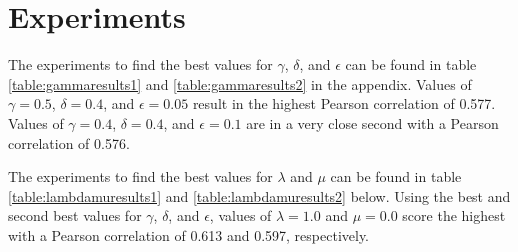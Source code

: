 \documentclass{article}
\begin{document}



\section{Experiments} \label{sec:experiments}

The experiments to find the best values for $\gamma$, $\delta$, and $\epsilon$ can be found in table \ref{table:gammaresults1} and \ref{table:gammaresults2} in the appendix. Values of $\gamma = 0.5$, $\delta = 0.4$, and $\epsilon = 0.05$ result in the highest Pearson correlation of 0.577. Values of $\gamma = 0.4$, $\delta = 0.4$, and $\epsilon = 0.1$ are in a very close second with a Pearson correlation of 0.576. 

The experiments to find the best values for $\lambda$ and $\mu$ can be found in table \ref{table:lambdamuresults1} and \ref{table:lambdamuresults2} below. Using the best and second best values for $\gamma$, $\delta$, and $\epsilon$, values of $\lambda = 1.0$ and $\mu = 0.0$ score the highest with a Pearson correlation of 0.613 and 0.597, respectively.
\end{document}
